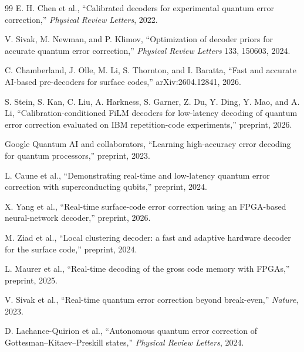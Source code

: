 \documentclass[11pt]{article}
\begin{document}
\begin{thebibliography}{99}
E. H. Chen et al.,
``Calibrated decoders for experimental quantum error correction,''
\emph{Physical Review Letters}, 2022.

V. Sivak, M. Newman, and P. Klimov,
``Optimization of decoder priors for accurate quantum error correction,''
\emph{Physical Review Letters} 133, 150603, 2024.

C. Chamberland, J. Olle, M. Li, S. Thornton, and I. Baratta,
``Fast and accurate AI-based pre-decoders for surface codes,''
arXiv:2604.12841, 2026.

S. Stein, S. Kan, C. Liu, A. Harkness, S. Garner, Z. Du, Y. Ding, Y. Mao, and
A. Li,
``Calibration-conditioned FiLM decoders for low-latency decoding of quantum
error correction evaluated on IBM repetition-code experiments,''
preprint, 2026.

Google Quantum AI and collaborators,
``Learning high-accuracy error decoding for quantum processors,''
preprint, 2023.

L. Caune et al.,
``Demonstrating real-time and low-latency quantum error correction with
superconducting qubits,''
preprint, 2024.

X. Yang et al.,
``Real-time surface-code error correction using an FPGA-based neural-network
decoder,''
preprint, 2026.

M. Ziad et al.,
``Local clustering decoder: a fast and adaptive hardware decoder for the
surface code,''
preprint, 2024.

L. Maurer et al.,
``Real-time decoding of the gross code memory with FPGAs,''
preprint, 2025.

V. Sivak et al.,
``Real-time quantum error correction beyond break-even,''
\emph{Nature}, 2023.

D. Lachance-Quirion et al.,
``Autonomous quantum error correction of Gottesman--Kitaev--Preskill states,''
\emph{Physical Review Letters}, 2024.

\end{thebibliography}
\end{document}
